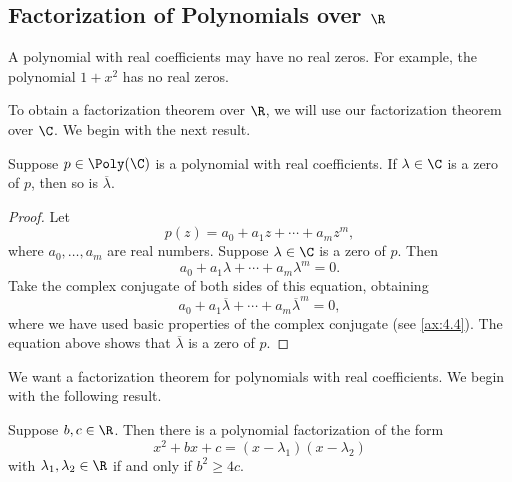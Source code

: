 \subsection{\texorpdfstring{Factorization of Polynomials over $\R$}%
{Factorization of Polynomials over R}}

%
A polynomial with real coefficients may have no real zeros. For example, the
polynomial $1+x^2$ has no real zeros.

To obtain a factorization theorem over $\R$, we will use our factorization
theorem over $\C$. We begin with the next result.

\begin{result}\label{ax:4.14}
Suppose $p\in\Poly(\C)$ is a polynomial with real coefficients. If
$\lambda\in\C$ is a zero of $p$, then so is $\overline{\lambda}$.
\end{result}

\begin{proof}
Let
\[ p(z) = a_0+a_1z+\cdots+a_mz^m, \]
where $a_0,\dots,a_m$ are real numbers. Suppose $\lambda\in\C$ is a zero of
$p$. Then
\[ a_0+a_1\lambda+\cdots+a_m\lambda^m = 0. \]
Take the complex conjugate of both sides of this equation, obtaining
\[ a_0+a_1\overline{\lambda}+\cdots+a_m\overline{\lambda}^m = 0, \]
where we have used basic properties of the complex conjugate (see
\ref{ax:4.4}). The equation above shows that $\overline{\lambda}$ is a zero of
$p$.
\end{proof}

%
We want a factorization theorem for polynomials with real coefficients. We
begin with the following result.

\begin{result}\label{ax:4.15}
Suppose $b,c\in\R$. Then there is a polynomial factorization of the form
\[ x^2+bx+c = (x-\lambda_1)(x-\lambda_2) \]
with $\lambda_1,\lambda_2\in\R$ if and only if $b^2\ge4c$.
\end{result}

